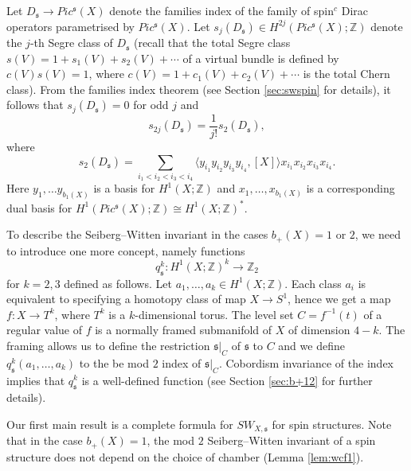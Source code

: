 \documentclass{amsart}
\theoremstyle{definition}
\theoremstyle{remark}
\numberwithin{equation}{section}
\begin{document}
Let $D_\mathfrak{s} \to Pic^{\mathfrak{s}}(X)$ denote the families index of the family of spin$^c$ Dirac operators parametrised by $Pic^{\mathfrak{s}}(X)$. Let $s_j(D_\mathfrak{s}) \in H^{2j}( Pic^{\mathfrak{s}}(X) ; \mathbb{Z})$ denote the $j$-th Segre class of $D_\mathfrak{s}$ (recall that the total Segre class $s(V) = 1 + s_1(V) + s_2(V) + \cdots $ of a virtual bundle is defined by $c(V)s(V) = 1$, where $c(V) = 1 + c_1(V) + c_2(V) + \cdots $ is the total Chern class). From the families index theorem (see Section \ref{sec:swspin} for details), it follows that $s_j(D_\mathfrak{s}) = 0$ for odd $j$ and
\[
s_{2j}(D_\mathfrak{s}) = \frac{1}{j!} s_2(D_\mathfrak{s}),
\]
where
\begin{equation}\label{equ:seg2}
s_2(D_\mathfrak{s}) = \sum_{i_1 < i_2 < i_3 < i_4} \langle y_{i_1} y_{i_2} y_{i_3} y_{i_4} , [X] \rangle x_{i_1} x_{i_2} x_{i_3} x_{i_4}.
\end{equation}
Here $y_1, \dots y_{b_1(X)}$ is a basis for $H^1(X ; \mathbb{Z})$ and $x_1 , \dots , x_{b_1(X)}$ is a corresponding dual basis for $H^1( Pic^\mathfrak{s}(X) ; \mathbb{Z}) \cong H^1(X ; \mathbb{Z})^*$.

To describe the Seiberg--Witten invariant in the cases $b_+(X) = 1$ or $2$, we need to introduce one more concept, namely functions 
\[
q_{\mathfrak{s}}^k : H^1(X ; \mathbb{Z})^k \to \mathbb{Z}_2
\]
for $k=2,3$ defined as follows. Let $a_1, \dots , a_k \in H^1(X ; \mathbb{Z})$. Each class $a_i$ is equivalent to specifying a homotopy class of map $X \to S^1$, hence we get a map $f : X \to T^k$, where $T^k$ is a $k$-dimensional torus. The level set $C = f^{-1}(t)$ of a regular value of $f$ is a normally framed submanifold of $X$ of dimension $4-k$. The framing allows us to define the restriction $\mathfrak{s}|_C$ of $\mathfrak{s}$ to $C$ and we define $q^k_{\mathfrak{s}}(a_1 , \dots , a_k)$ to the be mod $2$ index of $\mathfrak{s}|_{C}$. Cobordism invariance of the index implies that $q^k_{\mathfrak{s}}$ is a well-defined function (see Section \ref{sec:b+12} for further details).

Our first main result is a complete formula for $SW_{X,\mathfrak{s}}$ for spin structures. Note that in the case $b_+(X) = 1$, the mod $2$ Seiberg--Witten invariant of a spin structure does not depend on the choice of chamber (Lemma \ref{lem:wcf1}).
\end{document}
